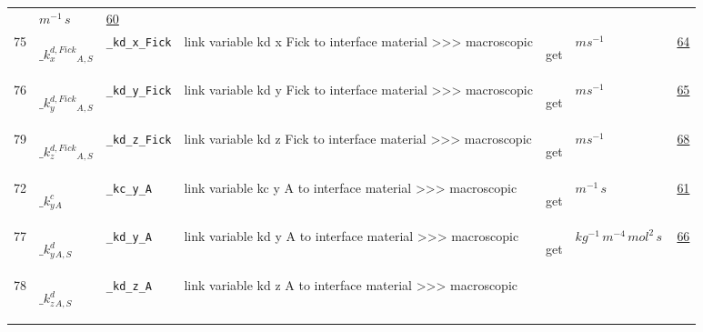 \begin{longtable}{|p{1cm}|p{2.5cm}|p{4.5cm}|p{8cm}|p{3.0cm}|p{3cm}|p{1cm}|}
             & $ m^{-1} \,s \, $
             &                 \hyperlink{"e:60"}{ 60 }
                 \\
            75
             & \hypertarget{"v:75"}{ $ {{\_k^{d,Fick}_x}}{_{A, S}} $}
             & \verb|_kd_x_Fick|
             & link variable kd x Fick to interface material >>> macroscopic
             & \begin{lay}get \end{lay}
             & $ m s^{-1} \, $
             &                 \hyperlink{"e:64"}{ 64 }
                 \\
            76
             & \hypertarget{"v:76"}{ $ {{\_k^{d,Fick}_y}}{_{A, S}} $}
             & \verb|_kd_y_Fick|
             & link variable kd y Fick to interface material >>> macroscopic
             & \begin{lay}get \end{lay}
             & $ m s^{-1} \, $
             &                 \hyperlink{"e:65"}{ 65 }
                 \\
            79
             & \hypertarget{"v:79"}{ $ {{\_k^{d,Fick}_z}}{_{A, S}} $}
             & \verb|_kd_z_Fick|
             & link variable kd z Fick to interface material >>> macroscopic
             & \begin{lay}get \end{lay}
             & $ m s^{-1} \, $
             &                 \hyperlink{"e:68"}{ 68 }
                 \\
            72
             & \hypertarget{"v:72"}{ $ {{\_k^c_y}}{_{A}} $}
             & \verb|_kc_y_A|
             & link variable kc y A to interface material >>> macroscopic
             & \begin{lay}get \end{lay}
             & $ m^{-1} \,s \, $
             &                 \hyperlink{"e:61"}{ 61 }
                 \\
            77
             & \hypertarget{"v:77"}{ $ {{\_k^d_y}}{_{A, S}} $}
             & \verb|_kd_y_A|
             & link variable kd y A to interface material >>> macroscopic
             & \begin{lay}get \end{lay}
             & $ kg^{-1} \,m^{-4} \,mol^{2} \,s \, $
             &                 \hyperlink{"e:66"}{ 66 }
                 \\
            78
             & \hypertarget{"v:78"}{ $ {{\_k^d_z}}{_{A, S}} $}
             & \verb|_kd_z_A|
             & link variable kd z A to interface material >>> macroscopic

\end{longtable}
